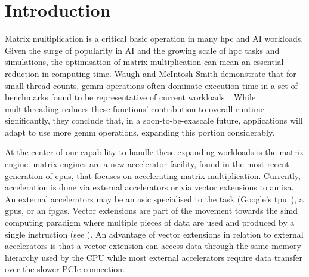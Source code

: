 \documentclass[\main/thesis.tex]{subfiles}
\begin{document}
\chapter{Introduction}
\label{cha:intro}

Matrix multiplication is a critical basic operation in many \gls{hpc} and AI workloads.
Given the surge of popularity in AI and the growing scale of \gls{hpc} tasks and simulations, the optimisation of matrix multiplication can mean an essential reduction in computing time.
Waugh and McIntosh-Smith demonstrate that for small thread counts, \gls{gemm} operations often dominate execution time in a set of benchmarks found to be representative of current workloads~\autocite{waugh2020use}.
While multithreading reduces these functions' contribution to overall runtime significantly, they conclude that, in a soon-to-be-exascale future, applications will adapt to use more \gls{gemm} operations, expanding this portion considerably.

At the center of our capability to handle these expanding workloads is the \gls{matrix engine}.
\Glspl{matrix engine} are a new accelerator facility, found in the most recent generation of \glspl{cpu}, that focuses on accelerating matrix multiplication.
Currently, acceleration is done via external accelerators or via vector extensions to an \gls{isa}.
An external accelerators may be an \gls{asic} specialised to the task (\eg Google's \gls{tpu}~\autocite{abadi2016tensorflow}), a \glspl{gpu}, or an \glspl{fpga}.
Vector extensions are part of the movement towards the \gls{simd} computing paradigm where multiple pieces of data are used and produced by a single instruction (see ).
An advantage of vector extensions in relation to external accelerators is that a vector extension can access data through the same memory hierarchy used by the CPU while most external accelerators require data transfer over the slower PCIe connection.
\end{document}
